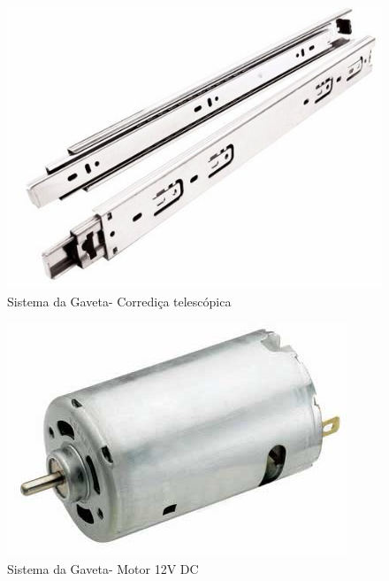 \begin{figure}[!htb]
	\centering
	\includegraphics[scale=0.25]{figuras/1.png} 
	\caption{Sistema da Gaveta- Corrediça telescópica}
	\label{Rotulo}
\end{figure}

\begin{figure}[!htb]
	\centering
	\includegraphics[scale=0.25]{figuras/2.png} 
	\caption{Sistema da Gaveta- Motor 12V DC}
	\label{Rotulo}
\end{figure}

